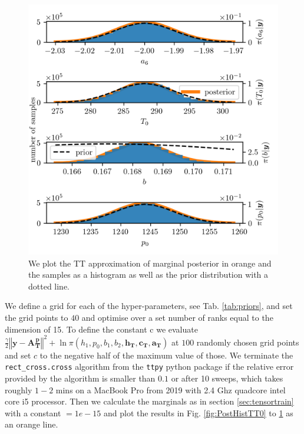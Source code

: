 \begin{figure}[ht!]
	\centering
	\includegraphics{PHdPTPost4.png}
	\caption[Histograms and TT approximation of posterior distribution as well as hyper-prior distribution.]{We plot the TT approximation of marginal posterior in orange and the samples as a histogram as well as the prior distribution with a dotted line.}
	\label{fig:PostHistTT4}
\end{figure}
We define a grid for each of the hyper-parameters, see Tab. \ref{tab:priors}, and set the grid points to $40$ and optimise over a set number of ranks equal to the dimension of 15.
To define the constant c we evaluate $\frac{\gamma}{2} \left\Vert \bm{y}- \bm{A} \frac{\bm{p}}{\bm{T}}  \right\Vert^2 + \ln{\pi(h_1,p_0,b_1,b_2,\bm{h_T},\bm{c_T},\bm{a_T})}$ at $100$ randomly chosen grid points and set $c$ to the negative half of the maximum value of those.
We terminate the \texttt{rect\_cross.cross} algorithm from the \texttt{ttpy} python package if the relative error provided by the algorithm is smaller than $0.1$ or after 10 sweeps, which takes roughly $1-2$ mins on a MacBook Pro from 2019 with 2.4 Ghz quadcore intel core i5 processor.
Then we calculate the marginals as in section \ref{sec:tensortrain} with a constant $= 1e-15$ and plot the results in Fig. \ref{fig:PostHistTT0} to \ref{fig:PostHistTT4} as an orange line.


